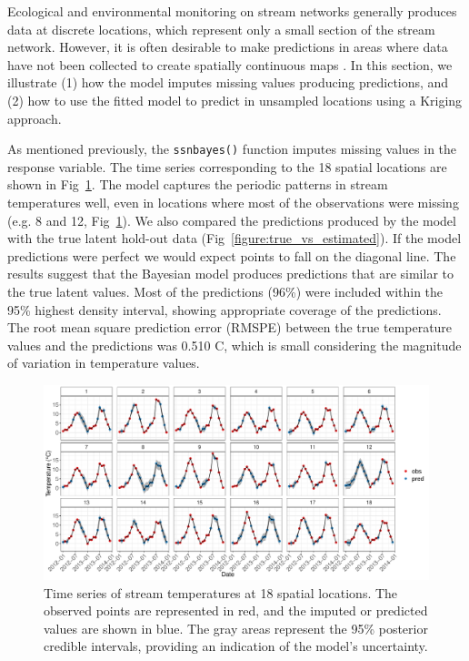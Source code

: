 Ecological and environmental monitoring on stream networks generally produces data at discrete locations, which represent only a small section of the stream network. However, it is often desirable to make predictions in areas where data have not been collected to create spatially continuous maps \citep{isaak2017norwest}. 
In this section, we illustrate (1) how the model imputes missing values producing predictions, and (2) how to use the fitted model to predict in unsampled locations using a Kriging approach.

As mentioned previously, the \texttt{ssnbayes()} function imputes missing values in the response variable.  
The time series corresponding to the 18 spatial locations are shown in  Fig~\ref{figure:time_series_obs_pred}. 
The model captures the periodic patterns in stream temperatures well, even in locations where most of the observations were missing (e.g. 8 and 12, Fig~\ref{figure:time_series_obs_pred}).
We also compared the predictions produced by the model with the true latent hold-out data (Fig~\ref{figure:true_vs_estimated}).
If the model predictions were perfect we would expect points to fall on the diagonal line. The results suggest that the Bayesian model produces predictions that are similar to the true latent values. Most of the predictions (96\%) were included within the 
95\% highest density interval, showing appropriate coverage of the predictions.  
The root mean square prediction error (RMSPE) between the true temperature values and the predictions was 0.510 \textdegree{}C, which is small considering the magnitude of variation in temperature values.


\begin{figure}[h]
  \centering
   \includegraphics[width=6.0in]{./Figs_Pay/time_series_obs_pred.pdf}
  \caption{
  Time series of stream temperatures at 18 spatial locations. The observed points are represented in red, and the imputed or predicted values are shown in blue. The gray areas represent the 95\% posterior credible intervals, providing an indication of the model's uncertainty.
  }
  \label{figure:time_series_obs_pred}
\end{figure}

